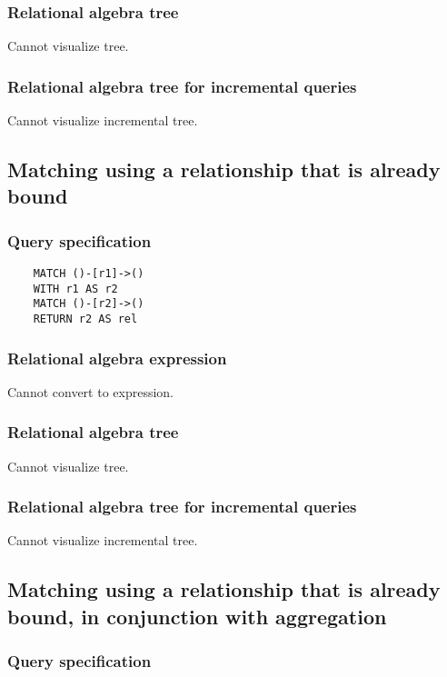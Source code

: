 	\subsubsection*{Relational algebra tree}

	Cannot visualize tree.

	\subsubsection*{Relational algebra tree for incremental queries}

	Cannot visualize incremental tree.
	\subsection{Matching using a relationship that is already bound}

	\subsubsection*{Query specification}

	\begin{lstlisting}
	MATCH ()-[r1]->()
	WITH r1 AS r2
	MATCH ()-[r2]->()
	RETURN r2 AS rel
	\end{lstlisting}


	\subsubsection*{Relational algebra expression}

	Cannot convert to expression.

	\subsubsection*{Relational algebra tree}

	Cannot visualize tree.

	\subsubsection*{Relational algebra tree for incremental queries}

	Cannot visualize incremental tree.
	\subsection{Matching using a relationship that is already bound, in conjunction with aggregation}

	\subsubsection*{Query specification}

